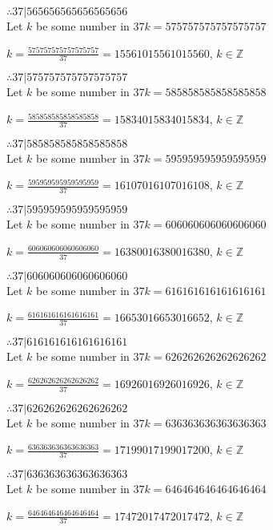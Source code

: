 \documentclass{article}
\begin{document}
$ \therefore  37|565656565656565656 $ \\

Let $k$ be some number in $37k = 575757575757575757$

$k = \frac{575757575757575757}{37} = 15561015561015560$, $k \in \mathbb{Z}$

$ \therefore  37|575757575757575757 $ \\

Let $k$ be some number in $37k = 585858585858585858$

$k = \frac{585858585858585858}{37} = 15834015834015834$, $k \in \mathbb{Z}$

$ \therefore  37|585858585858585858 $ \\

Let $k$ be some number in $37k = 595959595959595959$

$k = \frac{595959595959595959}{37} = 16107016107016108$, $k \in \mathbb{Z}$

$ \therefore  37|595959595959595959 $ \\

Let $k$ be some number in $37k = 606060606060606060$

$k = \frac{606060606060606060}{37} = 16380016380016380$, $k \in \mathbb{Z}$

$ \therefore  37|606060606060606060 $ \\

Let $k$ be some number in $37k = 616161616161616161$

$k = \frac{616161616161616161}{37} = 16653016653016652$, $k \in \mathbb{Z}$

$ \therefore  37|616161616161616161 $ \\

Let $k$ be some number in $37k = 626262626262626262$

$k = \frac{626262626262626262}{37} = 16926016926016926$, $k \in \mathbb{Z}$

$ \therefore  37|626262626262626262 $ \\

Let $k$ be some number in $37k = 636363636363636363$

$k = \frac{636363636363636363}{37} = 17199017199017200$, $k \in \mathbb{Z}$

$ \therefore  37|636363636363636363 $ \\

Let $k$ be some number in $37k = 646464646464646464$

$k = \frac{646464646464646464}{37} = 17472017472017472$, $k \in \mathbb{Z}$
\end{document}
